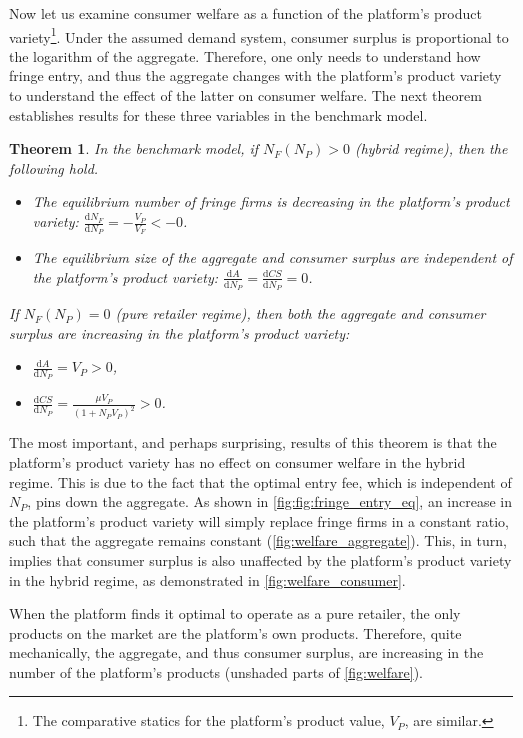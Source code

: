 \documentclass[a4paper]{article}
\newtheorem{theorem}{Theorem}
\newcommand{\dd}{\mathrm{d}}
\begin{document}
Now let us examine consumer welfare as a function of the platform's product variety\footnote{
    The comparative statics for the platform's product value, $V_P$, are similar.
}.
Under the assumed demand system, consumer surplus is proportional to the logarithm of the aggregate.
Therefore, one only needs to understand how fringe entry, and thus the aggregate changes with the platform's product variety to understand the effect of the latter on consumer welfare.
The next theorem establishes results for these three variables in the benchmark model.
\begin{theorem}
    \label{prop:equilibrium_benchmark}
    In the benchmark model, if $N_F(N_P) > 0$ (hybrid regime), then the following hold.
    \begin{itemize}
        \item The equilibrium number of fringe firms is decreasing in the platform's product variety: $\frac{\dd N_F}{\dd N_P} = -\frac{V_P}{V_F} < -0$.
        \item The equilibrium size of the aggregate and consumer surplus are independent of the platform's product variety: $\frac{\dd A}{\dd N_P} = \frac{\dd CS}{\dd N_P} = 0$.
    \end{itemize}
    If $N_F(N_P) = 0$ (pure retailer regime), then both the aggregate and consumer surplus are increasing in the platform's product variety:
    \begin{itemize}
        \item $\frac{\dd A}{\dd N_P} = V_P > 0$,
        \item $\frac{\dd CS}{\dd N_P} = \frac{\mu V_P}{(1 + N_P V_P)^2} > 0$.
    \end{itemize}
\end{theorem}

The most important, and perhaps surprising, results of this theorem is that the platform's product variety has no effect on consumer welfare in the hybrid regime.
This is due to the fact that the optimal entry fee, which is independent of $N_P$, pins down the aggregate.
As shown in \cref{fig:fig:fringe_entry_eq}, an increase in the platform's product variety will simply replace fringe firms in a constant ratio, such that the aggregate remains constant (\cref{fig:welfare_aggregate}).
This, in turn, implies that consumer surplus is also unaffected by the platform's product variety in the hybrid regime, as demonstrated in \cref{fig:welfare_consumer}.

When the platform finds it optimal to operate as a pure retailer, the only products on the market are the platform's own products.
Therefore, quite mechanically, the aggregate, and thus consumer surplus, are increasing in the number of the platform's products (unshaded parts of \cref{fig:welfare}).
\end{document}
